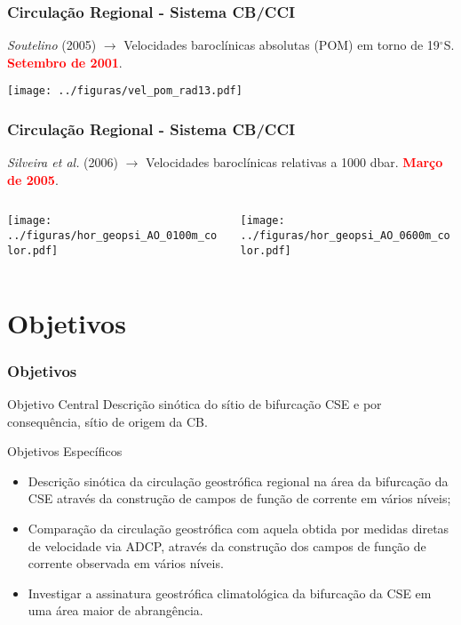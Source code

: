 \documentclass[pdftex]{beamer}
\begin{document}
\frame
{
  \frametitle{Circulação Regional - Sistema CB/CCI}
\begin{center}
{\small {\it Soutelino} (2005) $\rightarrow$ Velocidades baroclínicas absolutas (POM) em torno de 
19$^\circ$S. {\bf \textcolor{red}{Setembro de 2001}}.}
\end{center}
\vspace{0.5cm}
\begin{center}
\texttt{[image: ../figuras/vel\_pom\_rad13.pdf]}  
\end{center}
}

\frame
{
  \frametitle{Circulação Regional - Sistema CB/CCI}
\begin{center}
{\small {\it Silveira et al.} (2006) $\rightarrow$ Velocidades baroclínicas relativas a 1000 dbar.
 {\bf \textcolor{red}{Março de 2005}}.}
\end{center}
\vspace{0.5cm}
\begin{columns}
  \begin{column}{6cm}
    \texttt{[image: ../figuras/hor\_geopsi\_AO\_0100m\_color.pdf]}
  \end{column}
  \begin{column}{6cm}
    \texttt{[image: ../figuras/hor\_geopsi\_AO\_0600m\_color.pdf]}
  \end{column}
\end{columns} 
}

\section[Objetivos]{Objetivos}

\frame
{
  \frametitle{Objetivos}
\begin{alertblock}{Objetivo Central}
Descrição sinótica do sítio de bifurcação CSE e por consequência, sítio de origem da CB.
\end{alertblock}

\begin{block}{Objetivos Específicos}
{\small
\vspace{0.2cm}
\begin{itemize}
\item Descrição sinótica da circulação geostrófica regional na área da bifurcação da
 CSE através da construção de campos de função de corrente em vários níveis;
\vspace{0.1cm}
\item Comparação da circulação geostrófica com aquela obtida por medidas diretas de
 velocidade via ADCP, através da construção dos campos de função de corrente observada em vários níveis.
\vspace{0.1cm}
\item Investigar a assinatura geostrófica climatológica da bifurcação da CSE em uma área maior de abrangência.
\end{itemize}
}
\end{block}
}
\end{document}
